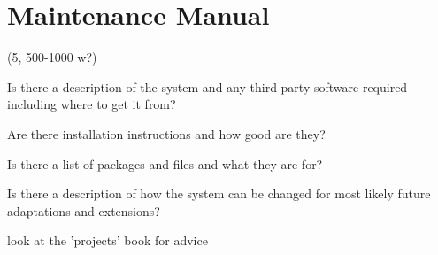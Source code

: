 \clearpage
\section{Maintenance Manual}
\label{sec:maintenance}


(5, 500-1000 w?)

Is there a description of the system and any third-party software required
including where to get it from?

Are there installation instructions and how good are they?

Is there a list of packages and files and what they are for?

Is there a description of how the system can be changed for most likely future
adaptations and extensions?

look at the 'projects' book for advice





